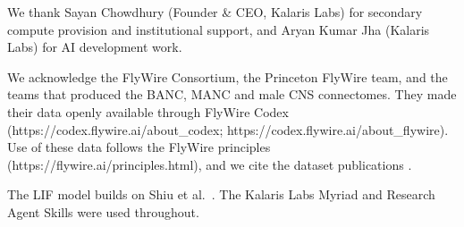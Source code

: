 \documentclass[11pt]{article}
\begin{document}
We thank Sayan Chowdhury (Founder \& CEO, Kalaris Labs) for secondary compute provision and institutional support, and Aryan Kumar Jha (Kalaris Labs) for AI development work.

We acknowledge the FlyWire Consortium, the Princeton FlyWire team, and the teams that produced the BANC, MANC and male CNS connectomes. They made their data openly available through FlyWire Codex (https://codex.flywire.ai/about\_codex; https://codex.flywire.ai/about\_flywire). Use of these data follows the FlyWire principles (https://flywire.ai/principles.html), and we cite the dataset publications \cite{dorkenwald2024,schlegel2024,bates2026,takemura2024,marin2024,berg2026}.

The LIF model builds on Shiu et al.~\cite{shiu2024}. The Kalaris Labs Myriad and Research Agent Skills were used throughout.
\end{document}
